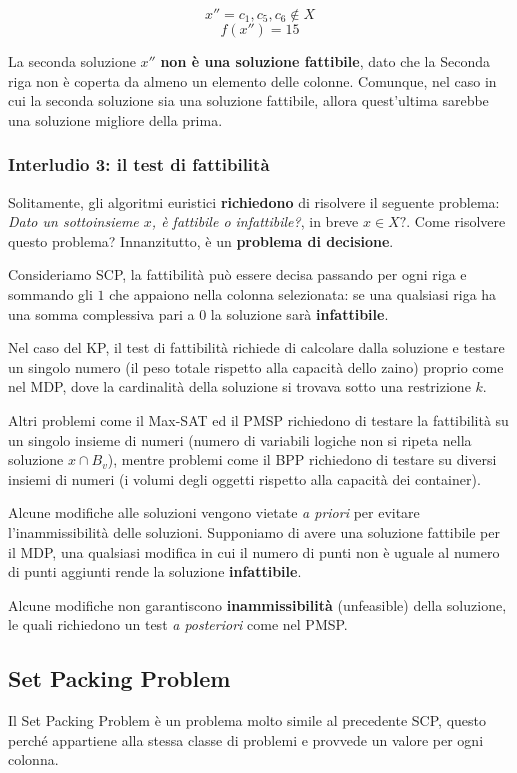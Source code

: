 \documentclass{article}
\begin{document}
$$x''={c_1,c_5,c_6 }\notin X$$
$$f(x'')=15$$

La seconda soluzione $x''$ \textbf{non è una soluzione fattibile}, dato che la Seconda
riga non è coperta da almeno un elemento delle colonne. Comunque, nel caso in cui
la seconda soluzione sia una soluzione fattibile, allora quest'ultima sarebbe una
soluzione migliore della prima.

\subsubsection{Interludio 3: il test di fattibilità}
Solitamente, gli algoritmi euristici \textbf{richiedono} di risolvere il seguente
problema: \textit{Dato un sottoinsieme $x$, è fattibile o infattibile?}, in breve
$x\in X \text{?}$. Come risolvere questo problema? Innanzitutto, è un \textbf{problema di decisione}.

Consideriamo SCP, la fattibilità può essere decisa passando per ogni riga e sommando gli $1$ che appaiono
nella colonna selezionata: se una qualsiasi riga ha una somma complessiva pari a $0$ la soluzione sarà
\textbf{infattibile}.

Nel caso del KP, il test di fattibilità richiede di calcolare dalla soluzione e testare un singolo numero
(il peso totale rispetto alla capacità dello zaino) proprio come nel MDP, dove la cardinalità della soluzione
si trovava sotto una restrizione $k$.

Altri problemi come il Max-SAT ed il PMSP richiedono di testare la fattibilità su un singolo insieme di
numeri (numero di variabili logiche non si ripeta nella soluzione $x\cap B_v$), mentre problemi come il BPP richiedono di testare su diversi insiemi di numeri (i volumi degli oggetti rispetto
alla capacità dei container).

Alcune modifiche alle soluzioni vengono vietate \textit{a priori} per evitare l'inammissibilità delle soluzioni.
Supponiamo di avere una soluzione fattibile per il MDP, una qualsiasi modifica in cui il numero di punti non è uguale
al numero di punti aggiunti rende la soluzione \textbf{infattibile}.

Alcune modifiche non garantiscono \textbf{inammissibilità} (unfeasible) della soluzione, le quali richiedono un test
\textit{a posteriori} come nel PMSP.

\subsection{Set Packing Problem}
Il Set Packing Problem è un problema molto simile al precedente SCP, questo perché appartiene alla stessa
classe di problemi e provvede un valore per ogni colonna.
\end{document}
